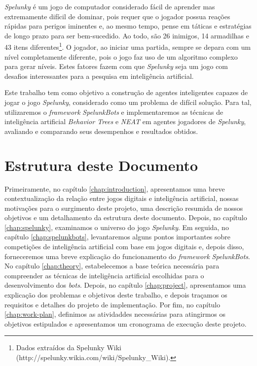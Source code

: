 \textit{Spelunky} é um jogo de computador considerado fácil de aprender mas
extremamente difícil de dominar, pois requer que o jogador possua reações
rápidas para perigos iminentes e, ao mesmo tempo, pense em táticas e estratégias
de longo prazo para ser bem-sucedido. Ao todo, são 26 inimigos, 14 armadilhas e
43 itens diferentes\footnote{Dados extraídos da Spelunky Wiki
(http://spelunky.wikia.com/wiki/Spelunky\_Wiki).}. O jogador, ao iniciar uma
partida, sempre se depara com um nível completamente diferente, pois o jogo faz
uso de um algoritmo complexo para gerar níveis. Estes fatores fazem com que
\textit{Spelunky} seja um jogo com desafios interessantes para a pesquisa em
inteligência artificial.

Este trabalho tem como objetivo a construção de agentes inteligentes capazes de
jogar o jogo \textit{Spelunky}, considerado como um problema de difícil solução.
Para tal, utilizaremos o \textit{framework} \textit{SpelunkBots} e
implementaremos as técnicas de inteligência artificial \textit{Behavior Trees} e
\textit{NEAT} em agentes jogadores de \textit{Spelunky}, avaliando e comparando
seus desempenhos e resultados obtidos.


\section{\label{section:document-structure}Estrutura deste Documento}
Primeiramente, no capítulo \ref{chap:introduction}, apresentamos uma breve
contextualização da relação entre jogos digitais e inteligência artificial,
nossas motivações para o surgimento deste projeto, uma descrição resumida de
nossos objetivos e um detalhamento da estrutura deste documento. Depois, no
capítulo \ref{chap:spelunky}, examinamos o universo do jogo \textit{Spelunky}.
Em seguida, no capítulo \ref{chap:spelunkbots}, levantaremos alguns pontos
importantes sobre competições de inteligência artificial com base em jogos
digitais e, depois disso, forneceremos uma breve explicação do funcionamento do
\textit{framework} \textit{SpelunkBots}. No capítulo \ref{chap:theory},
estabelecemos a base teórica necessária para compreender as técnicas de
inteligência artificial escolhidas para o desenvolvimento dos \textit{bots}.
Depois, no capítulo \ref{chap:project}, apresentamos uma explicação dos
problemas e objetivos deste trabalho, e depois traçamos os requisitos e detalhes
do projeto de implementação. Por fim, no capítulo \ref{chap:work-plan},
definimos as atividaddes necessárias para atingirmos os objetivos estipulados e
apresentamos um cronograma de execução deste projeto.
